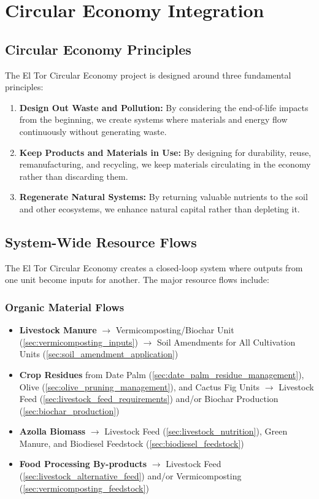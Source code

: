 \section{Circular Economy Integration}

\subsection{Circular Economy Principles}
The El Tor Circular Economy project is designed around three fundamental principles:

\begin{enumerate}
    \item \textbf{Design Out Waste and Pollution:} By considering the end-of-life impacts from the beginning, we create systems where materials and energy flow continuously without generating waste.
    
    \item \textbf{Keep Products and Materials in Use:} By designing for durability, reuse, remanufacturing, and recycling, we keep materials circulating in the economy rather than discarding them.
    
    \item \textbf{Regenerate Natural Systems:} By returning valuable nutrients to the soil and other ecosystems, we enhance natural capital rather than depleting it.
\end{enumerate}

\subsection{System-Wide Resource Flows}

The El Tor Circular Economy creates a closed-loop system where outputs from one unit become inputs for another. The major resource flows include:

\subsubsection{Organic Material Flows}
\begin{itemize}
    \item \textbf{Livestock Manure} $\rightarrow$ Vermicomposting/Biochar Unit (\ref{sec:vermicomposting_inputs}) $\rightarrow$ Soil Amendments for All Cultivation Units (\ref{sec:soil_amendment_application})
    \item \textbf{Crop Residues} from Date Palm (\ref{sec:date_palm_residue_management}), Olive (\ref{sec:olive_pruning_management}), and Cactus Fig Units $\rightarrow$ Livestock Feed (\ref{sec:livestock_feed_requirements}) and/or Biochar Production (\ref{sec:biochar_production})
    \item \textbf{Azolla Biomass} $\rightarrow$ Livestock Feed (\ref{sec:livestock_nutrition}), Green Manure, and Biodiesel Feedstock (\ref{sec:biodiesel_feedstock})
    \item \textbf{Food Processing By-products} $\rightarrow$ Livestock Feed (\ref{sec:livestock_alternative_feed}) and/or Vermicomposting (\ref{sec:vermicomposting_feedstock})
\end{itemize}

